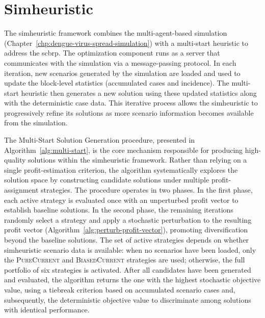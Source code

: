\section{Simheuristic}\label{sec:simheuristic}

The simheuristic framework combines the multi-agent-based simulation (Chapter~\ref{chp:dengue-virus-spread-simulation}) with a multi-start heuristic to address the \gls{scbrp}. The optimization component runs as a server that communicates with the simulation via a message-passing protocol. In each iteration, new scenarios generated by the simulation are loaded and used to update the block-level statistics (accumulated cases and incidence). The multi-start heuristic then generates a new solution using these updated statistics along with the deterministic case data. This iterative process allows the simheuristic to progressively refine its solutions as more scenario information becomes available from the simulation.


The Multi-Start Solution Generation procedure, presented in Algorithm~\ref{alg:multi-start},
is the core mechanism responsible for producing high-quality solutions within the simheuristic
framework. Rather than relying on a single profit-estimation criterion, the algorithm
systematically explores the solution space by constructing candidate solutions under multiple
profit-assignment strategies. The procedure operates in two phases. In the first phase,
each active strategy is evaluated once with an unperturbed profit vector to establish
baseline solutions. In the second phase, the remaining iterations randomly select a strategy
and apply a stochastic perturbation to the resulting profit vector
(Algorithm~\ref{alg:perturb-profit-vector}), promoting diversification beyond the baseline
solutions. The set of active strategies depends on whether simheuristic scenario data is
available: when no scenarios have been loaded, only the \textsc{PureCurrent} and
\textsc{BiasedCurrent} strategies are used; otherwise, the full portfolio of six strategies
is activated. After all candidates have been generated and evaluated, the algorithm returns
the one with the highest stochastic objective value, using a tiebreak criterion based on
accumulated scenario cases and, subsequently, the deterministic objective value to
discriminate among solutions with identical performance.

